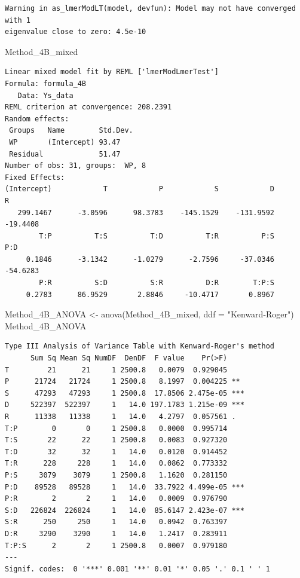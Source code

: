 \documentclass[
  letterpaper,
  DIV=11,
  numbers=noendperiod]{scrartcl}
\newenvironment{Shaded}{\begin{snugshade}}{\end{snugshade}}
\newcommand{\AttributeTok}[1]{\textcolor[rgb]{0.40,0.45,0.13}{#1}}
\newcommand{\FunctionTok}[1]{\textcolor[rgb]{0.28,0.35,0.67}{#1}}
\newcommand{\NormalTok}[1]{\textcolor[rgb]{0.00,0.23,0.31}{#1}}
\newcommand{\OtherTok}[1]{\textcolor[rgb]{0.00,0.23,0.31}{#1}}
\newcommand{\StringTok}[1]{\textcolor[rgb]{0.13,0.47,0.30}{#1}}
\begin{document}
\begin{verbatim}
Warning in as_lmerModLT(model, devfun): Model may not have converged with 1
eigenvalue close to zero: 4.5e-10
\end{verbatim}

\begin{Shaded}
\begin{Highlighting}[]
\NormalTok{Method\_4B\_mixed}
\end{Highlighting}
\end{Shaded}

\begin{verbatim}
Linear mixed model fit by REML ['lmerModLmerTest']
Formula: formula_4B
   Data: Ys_data
REML criterion at convergence: 208.2391
Random effects:
 Groups   Name        Std.Dev.
 WP       (Intercept) 93.47   
 Residual             51.47   
Number of obs: 31, groups:  WP, 8
Fixed Effects:
(Intercept)            T            P            S            D            R  
   299.1467      -3.0596      98.3783    -145.1529    -131.9592     -19.4408  
        T:P          T:S          T:D          T:R          P:S          P:D  
     0.1846      -3.1342      -1.0279      -2.7596     -37.0346     -54.6283  
        P:R          S:D          S:R          D:R        T:P:S  
     0.2783      86.9529       2.8846     -10.4717       0.8967  
\end{verbatim}

\begin{Shaded}
\begin{Highlighting}[]
\NormalTok{Method\_4B\_ANOVA }\OtherTok{\textless{}{-}} \FunctionTok{anova}\NormalTok{(Method\_4B\_mixed, }\AttributeTok{ddf =} \StringTok{"Kenward{-}Roger"}\NormalTok{)}
\NormalTok{Method\_4B\_ANOVA}
\end{Highlighting}
\end{Shaded}

\begin{verbatim}
Type III Analysis of Variance Table with Kenward-Roger's method
      Sum Sq Mean Sq NumDF  DenDF  F value    Pr(>F)    
T         21      21     1 2500.8   0.0079  0.929045    
P      21724   21724     1 2500.8   8.1997  0.004225 ** 
S      47293   47293     1 2500.8  17.8506 2.475e-05 ***
D     522397  522397     1   14.0 197.1783 1.215e-09 ***
R      11338   11338     1   14.0   4.2797  0.057561 .  
T:P        0       0     1 2500.8   0.0000  0.995714    
T:S       22      22     1 2500.8   0.0083  0.927320    
T:D       32      32     1   14.0   0.0120  0.914452    
T:R      228     228     1   14.0   0.0862  0.773332    
P:S     3079    3079     1 2500.8   1.1620  0.281150    
P:D    89528   89528     1   14.0  33.7922 4.499e-05 ***
P:R        2       2     1   14.0   0.0009  0.976790    
S:D   226824  226824     1   14.0  85.6147 2.423e-07 ***
S:R      250     250     1   14.0   0.0942  0.763397    
D:R     3290    3290     1   14.0   1.2417  0.283911    
T:P:S      2       2     1 2500.8   0.0007  0.979180    
---
Signif. codes:  0 '***' 0.001 '**' 0.01 '*' 0.05 '.' 0.1 ' ' 1
\end{verbatim}
\end{document}
